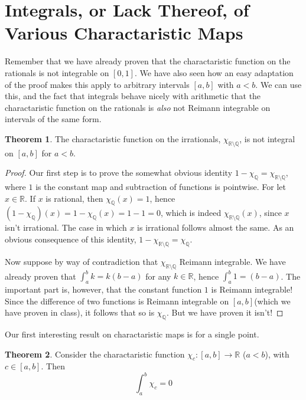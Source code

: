 \documentclass[12pt, letterpaper]{article}
\newcommand{\R}{\mathbb{R}}
\newcommand{\Q}{\mathbb{Q}}
\theoremstyle{definition}
\newtheorem{theorem}{Theorem}
\begin{document}
    \section{Integrals, or Lack Thereof, of Various Charactaristic Maps}

    Remember that we have already proven that the charactaristic function on the rationals is not integrable on $[0,1]$. We have also seen how an easy adaptation of the proof makes this apply to arbitrary intervals $ [a,b] $ with $ a  <b $. We can use this, and the fact that integrals behave nicely with arithmetic that the charactaristic function on the rationals is \textit{also} not Reimann integrable on intervals of the same form.
    
    \begin{theorem}
        The charactaristic function on the irrationals, $\chi_{\R\setminus \Q}$, is not integral on $[a,b]$ for $a < b$. 
    \end{theorem}

    \begin{proof}
        Our first step is to prove the somewhat obvious identity $1 - \chi_{\Q} = \chi_{\R\setminus \Q}$, where $1$ is the constant map and subtraction of functions is pointwise. For let $x\in \R$. If $x$ is rational, then $\chi_\Q(x) = 1$, hence $(1-\chi_{\Q})(x) = 1- \chi_{\Q}(x) = 1-1 = 0$,  which is indeed $ \chi_{\R\setminus \Q}(x) $, since $x$ isn't irrational. The case in which $x$ is irrational follows almost the same. As an obvious consequence of this identity, $1 - \chi_{\R\setminus\Q} = \chi_{\Q}$. 

        Now suppose by way of contradiction that $ \chi_{\R\setminus \Q} $ Reimann integrable. We have already proven that $ \int_a^b k = k(b-a) $ for any $k\in \R$, hence $ \int_a^b 1 = (b-a)$. The important part is, however, that the constant function $1$ is Reimann integrable! Since the difference of two functions is Reimann integrable on $ [a,b] $(which we have proven in class), it follows that so is $\chi_\Q$. But we have proven it isn't!
    \end{proof}
    
    Our first interesting result on charactaristic maps is for a single point.

    \begin{theorem}
        Consider the charactaristic function $\chi_c:[a,b]\to \R$ ($a<b$), with $c\in [a,b]$. Then 
        \[
            \int_{a}^{b} \chi_c = 0
            \]
    \end{theorem}
\end{document}
